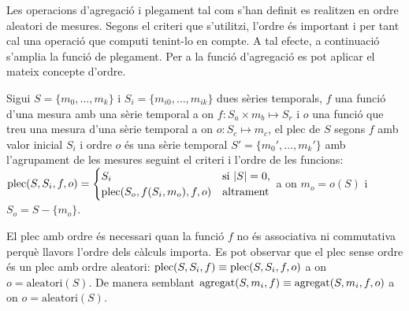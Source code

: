 Les operacions d'agregació i plegament tal com s'han definit es
realitzen en ordre aleatori de mesures. Segons el criteri que
s'utilitzi, l'ordre és important i per tant cal una operació que
computi tenint-lo en compte. A tal efecte, a continuació s'amplia la
funció de plegament. Per a la funció d'agregació es pot aplicar el
mateix concepte d'ordre.
\begin{definition}
  Sigui $S=\{m_0, \dotsc, m_k\}$ i $S_i=\{m_{i0}, \dotsc, m_{ik}\}$
  dues sèries temporals, $f$ una funció d'una mesura amb una sèrie
  temporal a on $f: S_a \times m_b \mapsto S_r$ i $o$ una funció que
  treu una mesura d'una sèrie temporal a on $o: S_c \mapsto m_c$, el
  plec de $S$ segons $f$ amb valor inicial $S_i$ i ordre $o$ és una
  sèrie temporal $S'= \{m_0', \dotsc, m_k'\}$ amb l'agrupament de les
  mesures seguint el criteri i l'ordre de les funcions:
  $\operatorname*{plec}(S,S_i,f,o) =
  \begin{cases}
    S_i & \text{si } |S|=0, \\
    \operatorname*{plec}(S_o,f(S_i,m_o),f,o) & \text{altrament}
  \end{cases}$ a on $m_o = o(S)$ i $S_o = S - \{m_o\}$.
\end{definition}

El plec amb ordre és necessari quan la funció $f$ no és associativa ni
commutativa perquè llavors l'ordre dels càlculs importa. Es pot
observar que el plec sense ordre és un plec amb ordre aleatori:
$\operatorname*{plec}(S,S_i,f)\equiv \operatorname*{plec}(S,S_i,f,o)$ a on $o=\text{aleatori}(S)$.
De manera semblant $\operatorname*{agregat}(S,m_i,f)\equiv \operatorname*{agregat}(S,m_i,f,o)$ a on
$o=\text{aleatori}(S)$.



